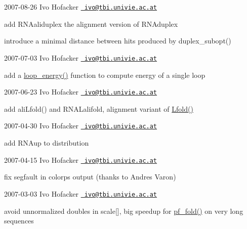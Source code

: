 2007-\/08-\/26 Ivo Hofacker \href{mailto:ivo@tbi.univie.ac.at}{\texttt{ ivo@tbi.\+univie.\+ac.\+at}}


\begin{DoxyItemize}
\item add R\+N\+Aaliduplex the alignment version of R\+N\+Aduplex
\item introduce a minimal distance between hits produced by duplex\+\_\+subopt()
\end{DoxyItemize}

2007-\/07-\/03 Ivo Hofacker \href{mailto:ivo@tbi.univie.ac.at}{\texttt{ ivo@tbi.\+univie.\+ac.\+at}}


\begin{DoxyItemize}
\item add a \mbox{\hyperlink{group__eval__deprecated_ga507d4fd93f4b398d793ba2402731388d}{loop\+\_\+energy()}} function to compute energy of a single loop
\end{DoxyItemize}

2007-\/06-\/23 Ivo Hofacker \href{mailto:ivo@tbi.univie.ac.at}{\texttt{ ivo@tbi.\+univie.\+ac.\+at}}


\begin{DoxyItemize}
\item add ali\+Lfold() and R\+N\+A\+Lalifold, alignment variant of \mbox{\hyperlink{group__mfe__window__deprecated_gafdd1e11b5c7ad443b9f86b818e67bab4}{Lfold()}}
\end{DoxyItemize}

2007-\/04-\/30 Ivo Hofacker \href{mailto:ivo@tbi.univie.ac.at}{\texttt{ ivo@tbi.\+univie.\+ac.\+at}}


\begin{DoxyItemize}
\item add R\+N\+Aup to distribution
\end{DoxyItemize}

2007-\/04-\/15 Ivo Hofacker \href{mailto:ivo@tbi.univie.ac.at}{\texttt{ ivo@tbi.\+univie.\+ac.\+at}}


\begin{DoxyItemize}
\item fix segfault in colorps output (thanks to Andres Varon)
\end{DoxyItemize}

2007-\/03-\/03 Ivo Hofacker \href{mailto:ivo@tbi.univie.ac.at}{\texttt{ ivo@tbi.\+univie.\+ac.\+at}}


\begin{DoxyItemize}
\item avoid unnormalized doubles in scale\mbox{[}\mbox{]}, big speedup for \mbox{\hyperlink{group__part__func__global__deprecated_gadc3db3d98742427e7001a7fd36ef28c2}{pf\+\_\+fold()}} on very long sequences
\end{DoxyItemize}

